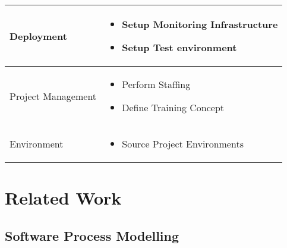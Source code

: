 \begin{tabularx}{\textwidth}{@{} l X @{}}
		\midrule
		Deployment & 
		\begin{itemize}
			\item Setup Monitoring Infrastructure
			\item Setup Test environment
		\end{itemize}
		\\
		\midrule
		Project Management & 
		\begin{itemize}
			\item Perform Staffing
			\item Define Training Concept
		\end{itemize}
		\\
		\midrule
		Environment & 
		\begin{itemize}
			\item Source Project Environments
		\end{itemize}
		\\
		\bottomrule
	\end{tabularx}


\section{Related Work}
\label{sec:ch6_related_work}

\subsection{Software Process Modelling}


